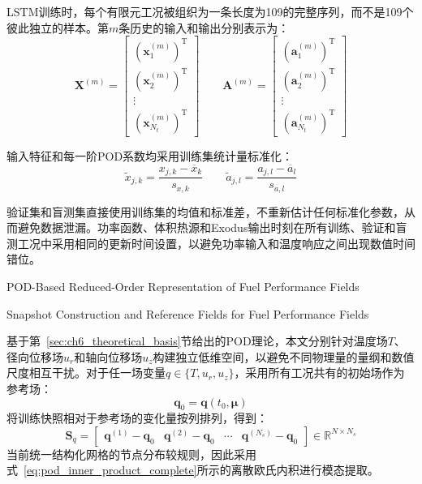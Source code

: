 LSTM训练时，每个有限元工况被组织为一条长度为109的完整序列，而不是109个彼此独立的样本。第$m$条历史的输入和输出分别表示为：
\begin{equation}
	\boldsymbol X^{(m)}
	=
	\begin{bmatrix}
		(\boldsymbol x_1^{(m)})^{\mathrm T}\\
		(\boldsymbol x_2^{(m)})^{\mathrm T}\\
		\vdots\\
		(\boldsymbol x_{N_t}^{(m)})^{\mathrm T}
	\end{bmatrix}
	\qquad
	\boldsymbol A^{(m)}
	=
	\begin{bmatrix}
		(\boldsymbol a_1^{(m)})^{\mathrm T}\\
		(\boldsymbol a_2^{(m)})^{\mathrm T}\\
		\vdots\\
		(\boldsymbol a_{N_t}^{(m)})^{\mathrm T}
	\end{bmatrix}
	\label{eq:formal_sequence_samples}
\end{equation}

输入特征和每一阶POD系数均采用训练集统计量标准化：
\begin{equation}
	\widetilde{x}_{j,k}
	=
	\frac{x_{j,k}-\overline{x}_k}{s_{x,k}}
	\qquad
	\widetilde{a}_{j,l}
	=
	\frac{a_{j,l}-\overline{a}_l}{s_{a,l}}
	\label{eq:formal_standardization}
\end{equation}

验证集和盲测集直接使用训练集的均值和标准差，不重新估计任何标准化参数，从而避免数据泄漏。功率函数、体积热源和Exodus输出时刻在所有训练、验证和盲测工况中采用相同的更新时间设置，以避免功率输入和温度响应之间出现数值时间错位。

{POD-Based Reduced-Order Representation of Fuel Performance Fields}
\label{sec:ch6_pod_application}

{Snapshot Construction and Reference Fields for Fuel Performance Fields}

基于第~\ref{sec:ch6_theoretical_basis}节给出的POD理论，本文分别针对温度场$T$、径向位移场$u_r$和轴向位移场$u_z$构建独立低维空间，以避免不同物理量的量纲和数值尺度相互干扰。对于任一场变量$q\in\{T,u_r,u_z\}$，采用所有工况共有的初始场作为参考场：
\begin{equation}
	\boldsymbol q_0
	=
	\boldsymbol q(t_0,\boldsymbol\mu)
	\label{eq:pod_reference_field_complete}
\end{equation}
将训练快照相对于参考场的变化量按列排列，得到：
\begin{equation}
	\boldsymbol S_q
	=
	\begin{bmatrix}
		\boldsymbol q^{(1)}-\boldsymbol q_0 &
		\boldsymbol q^{(2)}-\boldsymbol q_0 &
		\cdots &
		\boldsymbol q^{(N_s)}-\boldsymbol q_0
	\end{bmatrix}
	\in\mathbb R^{N\times N_s}
	\label{eq:pod_snapshot_matrix_complete}
\end{equation}
当前统一结构化网格的节点分布较规则，因此采用式~\eqref{eq:pod_inner_product_complete}所示的离散欧氏内积进行模态提取。

